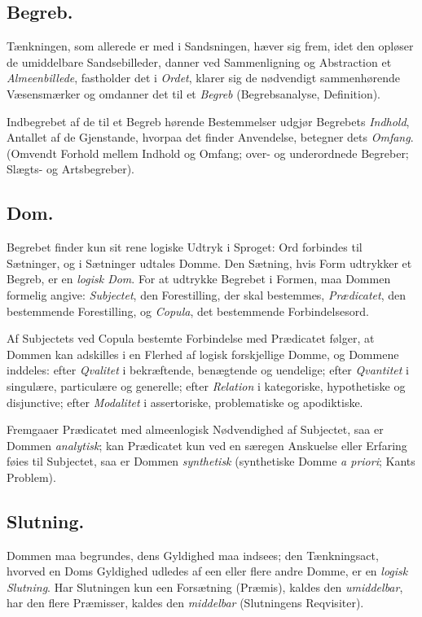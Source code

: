 \documentclass[12pt]{book}
\begin{document}
\subsection*{Begreb.}

Tænkningen, som allerede er med i Sandsningen, hæver sig frem,
idet den opløser de umiddelbare Sandsebilleder, danner ved Sammenligning
og Abstraction et \emph{Almeenbillede}, fastholder det i \emph{Ordet},
klarer sig de nødvendigt sammenhørende Væsensmærker og omdanner det
til et \emph{Begreb} (Begrebsanalyse, Definition).

Indbegrebet af de til et Begreb hørende Bestemmelser udgjør Begrebets
\emph{Indhold}, Antallet af de Gjenstande, hvorpaa det finder Anvendelse,
betegner dets \emph{Omfang}. (Omvendt Forhold mellem Indhold
og Omfang; over- og underordnede Begreber; Slægts- og Artsbegreber).

\subsection*{Dom.}

Begrebet finder kun sit rene logiske Udtryk i Sproget: Ord forbindes
til Sætninger, og i Sætninger udtales Domme. Den Sætning,
hvis Form udtrykker et Begreb, er en \emph{logisk Dom}. For at udtrykke
Begrebet i Formen, maa Dommen formelig angive: \emph{Subjectet}, den
Forestilling, der skal bestemmes, \emph{Prædicatet}, den bestemmende Forestilling,
og \emph{Copula}, det bestemmende Forbindelsesord.

Af Subjectets ved Copula bestemte Forbindelse med Prædicatet
følger, at Dommen kan adskilles i en Flerhed af logisk forskjellige
Domme, og Dommene inddeles: efter \emph{Qvalitet} i bekræftende, benægtende
og uendelige; efter \emph{Qvantitet} i singulære, particulære og generelle;
efter \emph{Relation} i kategoriske, hypothetiske og disjunctive; efter
\emph{Modalitet} i assertoriske, problematiske og apodiktiske.

Fremgaaer Prædicatet med almeenlogisk Nødvendighed af Subjectet,
saa er Dommen \emph{analytisk}; kan Prædicatet kun ved en særegen
Anskuelse eller Erfaring føies til Subjectet, saa er Dommen \emph{synthetisk}
(synthetiske Domme \textit{a priori}; Kants Problem).

\subsection*{Slutning.}

Dommen maa begrundes, dens Gyldighed maa indsees; den Tænkningsact,
hvorved en Doms Gyldighed udledes af een eller flere andre
Domme, er en \emph{logisk Slutning}. Har Slutningen kun een Forsætning
(Præmis), kaldes den \emph{umiddelbar}, har den flere Præmisser,
kaldes den \emph{middelbar} (Slutningens Reqvisiter).
\end{document}
